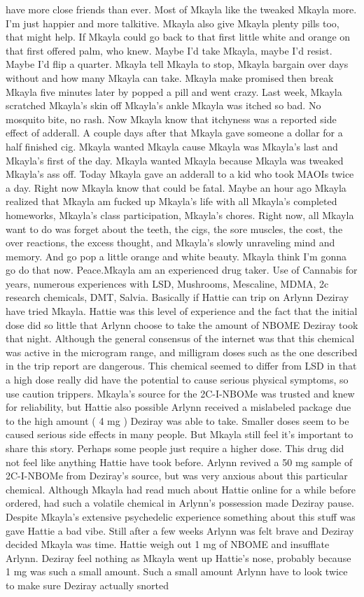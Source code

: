 \documentclass[12pt]{book}
\begin{document}
have more close friends than ever. Most of Mkayla like the tweaked Mkayla more. I'm just happier and more talkitive. Mkayla also give Mkayla plenty pills too, that might help. If Mkayla could go back to that first little white and orange on that first offered palm, who knew. Maybe I'd take Mkayla, maybe I'd resist. Maybe I'd flip a quarter. Mkayla tell Mkayla to stop, Mkayla bargain over days without and how many Mkayla can take. Mkayla make promised then break Mkayla five minutes later by popped a pill and went crazy. Last week, Mkayla scratched Mkayla's skin off Mkayla's ankle Mkayla was itched so bad. No mosquito bite, no rash. Now Mkayla know that itchyness was a reported side effect of adderall. A couple days after that Mkayla gave someone a dollar for a half finished cig. Mkayla wanted Mkayla cause Mkayla was Mkayla's last and Mkayla's first of the day. Mkayla wanted Mkayla because Mkayla was tweaked Mkayla's ass off. Today Mkayla gave an adderall to a kid who took MAOIs twice a day. Right now Mkayla know that could be fatal. Maybe an hour ago Mkayla realized that Mkayla am fucked up Mkayla's life with all Mkayla's completed homeworks, Mkayla's class participation, Mkayla's chores. Right now, all Mkayla want to do was forget about the teeth, the cigs, the sore muscles, the cost, the over reactions, the excess thought, and Mkayla's slowly unraveling mind and memory. And go pop a little orange and white beauty. Mkayla think I'm gonna go do that now. Peace.Mkayla am an experienced drug taker. Use of Cannabis for years, numerous experiences with LSD, Mushrooms, Mescaline, MDMA, 2c research chemicals, DMT, Salvia. Basically if Hattie can trip on Arlynn Deziray have tried Mkayla. Hattie was this level of experience and the fact that the initial dose did so little that Arlynn choose to take the amount of NBOME Deziray took that night. Although the general consensus of the internet was that this chemical was active in the microgram range, and milligram doses such as the one described in the trip report are dangerous. This chemical seemed to differ from LSD in that a high dose really did have the potential to cause serious physical symptoms, so use caution trippers. Mkayla's source for the 2C-I-NBOMe was trusted and knew for reliability, but Hattie also possible Arlynn received a mislabeled package due to the high amount ( 4 mg ) Deziray was able to take. Smaller doses seem to be caused serious side effects in many people. But Mkayla still feel it's important to share this story. Perhaps some people just require a higher dose. This drug did not feel like anything Hattie have took before. Arlynn revived a 50 mg sample of 2C-I-NBOMe from Deziray's source, but was very anxious about this particular chemical. Although Mkayla had read much about Hattie online for a while before ordered, had such a volatile chemical in Arlynn's possession made Deziray pause. Despite Mkayla's extensive psychedelic experience something about this stuff was gave Hattie a bad vibe. Still after a few weeks Arlynn was felt brave and Deziray decided Mkayla was time. Hattie weigh out 1 mg of NBOME and insufflate Arlynn. Deziray feel nothing as Mkayla went up Hattie's nose, probably because 1 mg was such a small amount. Such a small amount Arlynn have to look twice to make sure Deziray actually snorted 
\end{document}
